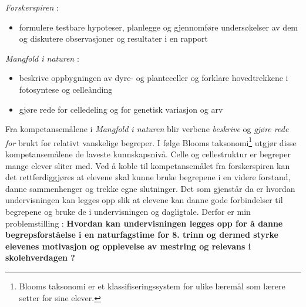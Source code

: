 \documentclass[main.tex]{subfiles}
\begin{document}
\begin{displayquote}
\emph{Forskerspiren} :
\begin{itemize}
\vspace{-2mm}
\item formulere testbare hypoteser, planlegge og gjennomføre undersøkelser 
av dem og diskutere observasjoner og resultater i en rapport
\end{itemize}
\emph{Mangfold i naturen} :
\begin{itemize}
\vspace{-2mm}
\item beskrive oppbygningen av dyre- og planteceller og forklare hovedtrekkene i fotosyntese 
og celleånding
\vspace{-3mm}
\item gjøre rede for celledeling og for genetisk variasjon og arv
\end{itemize}
\end{displayquote} 
Fra kompetansemålene i \emph{Mangfold i naturen} blir verbene \emph{beskrive} og \emph{gjøre rede for} brukt 
for relativt vanskelige begreper. I følge Blooms taksonomi\footnote{Blooms taksonomi er et klassifiseringssystem 
for ulike læremål som lærere setter for sine elever.} utgjør disse kompetansemålene de laveste 
kunnskapsnivå. Celle og cellestruktur er begreper mange elever sliter med. Ved å koble til kompetansemålet 
fra forskerspiren kan det rettferdiggjøres at elevene skal kunne bruke begrepene i en videre forstand, danne 
sammenhenger og trekke egne slutninger. Det som gjenstår da er hvordan undervisningen kan legges opp slik at elevene 
kan danne gode forbindelser til begrepene og bruke de i undervisningen og dagligtale.
\newline
\newline
Derfor er min problemstilling :
\newline
\newline
\textbf{Hvordan kan undervisningen legges opp for å danne begrepsforståelse i en naturfagstime for 8. trinn 
og dermed styrke elevenes motivasjon og opplevelse av mestring og relevans i skolehverdagen ?}
\end{document}
